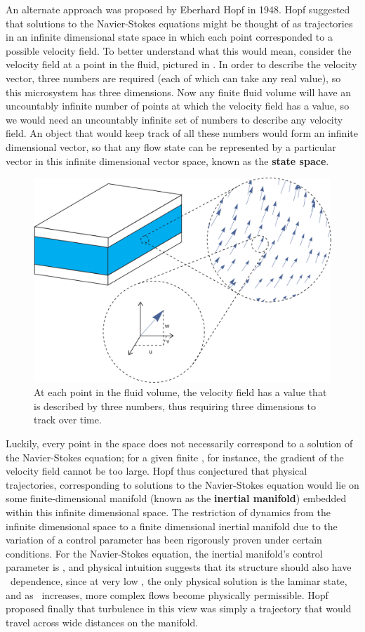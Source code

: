 An alternate approach was proposed by Eberhard Hopf in 1948. Hopf suggested that solutions to the Navier-Stokes equations might be thought of as trajectories in an infinite dimensional state space in which each point corresponded to a possible velocity field. To better understand what this would mean, consider the velocity field at a point in the fluid, pictured in . In order to describe the velocity vector, three numbers are required (each of which can take any real value), so this microsystem has three dimensions. Now any finite fluid volume will have an uncountably infinite number of points at which the velocity field has a value, so we would need an uncountably infinite set of numbers to describe any velocity field. An object that would keep track of all these numbers would form an infinite dimensional vector, so that any flow state can be represented by a particular vector in this infinite dimensional vector space, known as the {\bf state space}. 
\begin{figure}
\centerline{
\includegraphics[scale=0.6]{Figs/VectorSpace}}
\caption{At each point in the fluid volume, the velocity field has a value that is described by three numbers, thus requiring three dimensions to track over time.}\label{fig:VectorSpace}
\end{figure}
Luckily, every point in the space does not necessarily correspond to a solution of the Navier-Stokes equation; for a given finite \ReN, for instance, the gradient of the velocity field cannot be too large. Hopf thus conjectured that physical trajectories, corresponding to solutions to the Navier-Stokes equation would lie on some finite-dimensional manifold (known as the {\bf inertial manifold}) embedded within this infinite dimensional space. The restriction of dynamics from the infinite dimensional space to a finite dimensional inertial manifold due to the variation of a control parameter has been rigorously proven under certain conditions. For the Navier-Stokes equation, the inertial manifold's control parameter is \ReN, and physical intuition suggests that its structure should also have \ReN~dependence, since at very low \ReN, the only physical solution is the laminar state, and as \ReN~increases, more complex flows become physically permissible. Hopf proposed finally that turbulence in this view was simply a trajectory that would travel across wide distances on the manifold. \\
